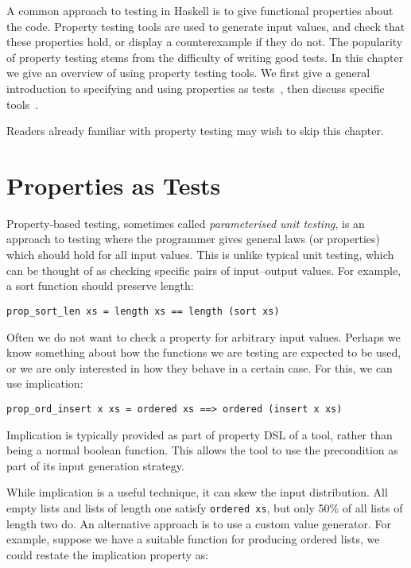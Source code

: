 A common approach to testing in Haskell is to give functional
properties about the code.  Property testing tools are used to
generate input values, and check that these properties hold, or
display a counterexample if they do not.  The popularity of property
testing stems from the difficulty of writing good tests.  In this
chapter we give an overview of using property testing tools.  We first
give a general introduction to specifying and using properties as
tests~, then discuss specific
tools~.

Readers already familiar with property testing may wish to skip this
chapter.

\section{Properties as Tests}
\label{sec:property_testing-intro}

Property-based testing\cite{claessen2000}, sometimes called \emph{parameterised
  unit testing}, is an approach to testing where the programmer gives general
laws (or properties) which should hold for all input values.  This is unlike
typical unit testing, which can be thought of as checking specific pairs of
input--output values.  For example, a sort function should preserve length:

\begin{verbatim}
prop_sort_len xs = length xs == length (sort xs)
\end{verbatim}

Often we do not want to check a property for arbitrary input values.
Perhaps we know something about how the functions we are testing are
expected to be used, or we are only interested in how they behave in a
certain case.  For this, we can use implication:

\begin{verbatim}
prop_ord_insert x xs = ordered xs ==> ordered (insert x xs)
\end{verbatim}

Implication is typically provided as part of property DSL of a tool,
rather than being a normal boolean function.  This allows the tool to
use the precondition as part of its input generation strategy.

While implication is a useful technique, it can skew the input distribution.
All empty lists and lists of length one satisfy \verb|ordered xs|, but only 50\%
of all lists of length two do.  An alternative approach is to use a custom value
generator.  For example, suppose we have a suitable function for producing
ordered lists, we could restate the implication property as:


